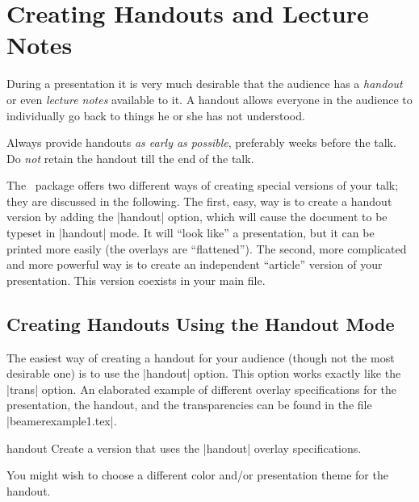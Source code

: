 %
%
%


\section{Creating Handouts and Lecture Notes}
\label{section-modes}

During a presentation it is very much desirable that the audience has a \emph{handout} or even \emph{lecture notes} available to it. A handout allows everyone in the audience to individually go back to things he or she has not understood.

Always provide handouts \emph{as early as possible}, preferably weeks before the talk. Do \emph{not} retain the handout till the end of the talk.

The \beamer\ package offers two different ways of creating special versions of your talk; they are discussed in the following. The first, easy, way is to create a handout version by adding the |handout| option, which will cause the document to be typeset in |handout| mode. It will ``look like'' a presentation, but it can be printed more easily (the overlays are ``flattened''). The second, more complicated and more powerful way is to create an independent ``article'' version of your presentation. This version coexists in your main file.


\subsection{Creating Handouts Using the Handout Mode}
\label{handout}

The easiest way of creating a handout for your audience (though not the most desirable one) is to use the |handout| option. This option works exactly like the |trans| option. An elaborated example of different overlay specifications for the presentation, the handout, and the transparencies can be found in the file |beamerexample1.tex|.

\begin{classoption}{handout}
  Create a version that uses the |handout| overlay specifications.

  You might wish to choose a different color and/or presentation theme for the handout.
\end{classoption}

